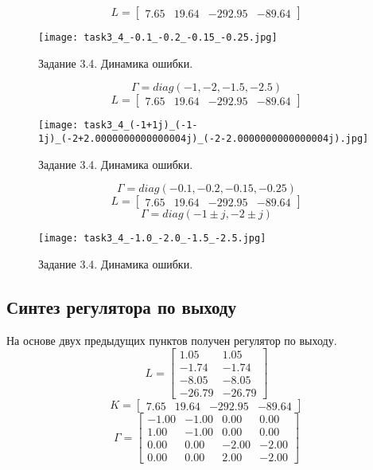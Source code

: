 \[L = \begin{bmatrix}
    7.65 &  19.64 & -292.95 & -89.64
  \end{bmatrix}\]
  \begin{figure}[]
    \centering
    \texttt{[image: task3\_4\_-0.1\_-0.2\_-0.15\_-0.25.jpg]}
    \caption{Задание 3.4. Динамика ошибки.}
    \label{fig:task3_4_-0.1_-0.2_-0.15_-0.25.jpg}
\end{figure}

  \[\Gamma = diag(-1,-2,-1.5,-2.5)\]
  \[L = \begin{bmatrix}
    7.65 &  19.64 & -292.95 & -89.64
  \end{bmatrix}\]
  \begin{figure}[]
    \centering
    \texttt{[image: task3\_4\_(-1+1j)\_(-1-1j)\_(-2+2.0000000000000004j)\_(-2-2.0000000000000004j).jpg]}
    \caption{Задание 3.4. Динамика ошибки.}
    \label{fig:task3_4_(-1+1j)_(-1-1j)_(-2+2.0000000000000004j)_(-2-2.0000000000000004j).jpg}
\end{figure}


  \[\Gamma = diag(-0.1,-0.2,-0.15,-0.25)\]
  \[L = \begin{bmatrix}
    7.65 &  19.64 & -292.95 & -89.64
  \end{bmatrix}\]
  \[\Gamma = diag(-1\pm j, -2\pm j)\]
  \begin{figure}[]
    \centering
    \texttt{[image: task3\_4\_-1.0\_-2.0\_-1.5\_-2.5.jpg]}
    \caption{Задание 3.4. Динамика ошибки.}
    \label{fig:task3_4_-1.0_-2.0_-1.5_-2.5.jpg}
\end{figure}

\subsection{Синтез регулятора по выходу}
На основе двух предыдущих пунктов получен регулятор по выходу.
\[L = \begin{bmatrix}
    1.05 &  1.05\\
   -1.74 & -1.74\\
   -8.05 & -8.05\\
   -26.79 & -26.79
  \end{bmatrix}\]
  \[K = \begin{bmatrix}
    7.65 &  19.64 & -292.95 & -89.64
  \end{bmatrix}\]
  \[\Gamma = \begin{bmatrix}
   -1.00 & -1.00 &  0.00 &  0.00\\
    1.00 & -1.00 &  0.00 &  0.00\\
    0.00 &  0.00 & -2.00 & -2.00\\
    0.00 &  0.00 &  2.00 & -2.00
  \end{bmatrix}\]

